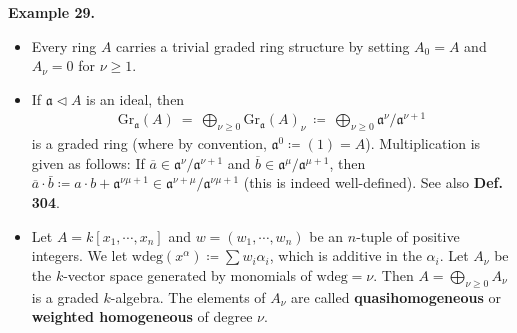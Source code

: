 \documentclass[12pt,a4paper,footinclude=true,headinclude=true]{scrbook} %
\newenvironment{example}[2][Example]
    { \begin{mdframed}[backgroundcolor=gray!20] \textbf{#1 #2.} }
    {  \end{mdframed}}
\begin{document}
\begin{example}{29}
    \begin{itemize}
        \item[(a)] Every ring $A$ carries a trivial graded ring structure by setting $A_0=A$ and $A_\nu=0$ for $\nu\geq1$.
        \item[(b)] If $\mathfrak{a}\triangleleft A$ is an ideal, then 
        \begin{align*}
            \mathrm{Gr}_\mathfrak{a}(A)\ =\ \bigoplus_{\nu\geq0}\mathrm{Gr}_\mathfrak{a}(A)_\nu
            \ \coloneqq\ \bigoplus_{\nu\geq0}\mathfrak{a}^\nu/\mathfrak{a}^{\nu+1}
        \end{align*}
        is a graded ring (where by convention, $\mathfrak{a}^0\coloneqq(1)=A$). Multiplication is given as follows: If $\overline{a}\in\mathfrak{a}^\nu/\mathfrak{a}^{\nu+1}$ and $\overline{b}\in\mathfrak{a}^\mu/\mathfrak{a}^{\mu+1}$, then $\overline{a}\cdot\bar{b}\coloneqq a\cdot b+\mathfrak{a}^{\nu\mu+1}\in\mathfrak{a}^{\nu+\mu}/\mathfrak{a}^{\nu\mu+1}$ (this is indeed well-defined). See also \textbf{Def. 304}.
        \item[(c)] Let $A=k[x_1,\cdots,x_n]$ and $w=(w_1,\cdots,w_n)$ be an $n$-tuple of positive integers. We let $\mathrm{wdeg}(x^\alpha)\coloneqq\sum w_i\alpha_i$, which is additive in the $\alpha_i$. Let $A_\nu$ be the $k$-vector space generated by monomials of $\mathrm{wdeg}=\nu$. Then $A=\bigoplus_{\nu\geq0}A_\nu$ is a graded $k$-algebra. The elements of $A_\nu$ are called \textbf{quasihomogeneous} or \textbf{weighted homogeneous} of degree $\nu$. 
    \end{itemize}
\end{example}
    
\newpage    
\end{document}
